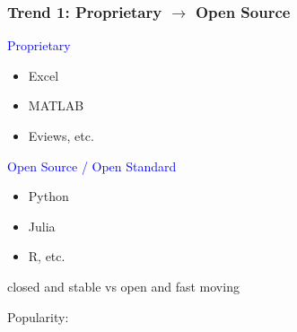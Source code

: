 \documentclass[
    xcolor={svgnames,dvipsnames},
    hyperref={colorlinks, citecolor=DeepPink4, linkcolor=DarkRed, urlcolor=DarkBlue}
    ]{beamer}  %
\newcommand{\blue}[1]{\textcolor{Blue}{\sf #1}}
\newcommand{\1}{\mathbbm 1}
\begin{document}
\begin{frame}
    \frametitle{Trend 1: Proprietary $\to$ Open Source}
    
    \blue{Proprietary} 
    \begin{itemize}
        \item Excel
        \item MATLAB
        \item Eviews, etc. 
    \end{itemize}
    

    \vspace{0.5em}
    \vspace{0.5em}
    \blue{Open Source / Open Standard} 
    
    \begin{itemize}
        \item Python
        \item Julia
        \item R, etc.
    \end{itemize}


    \begin{center}
        closed and stable vs open and fast moving
    \end{center}

\end{frame}

\begin{frame}

    Popularity:

    \begin{figure}
       \begin{center}
       \end{center}
    \end{figure}

\end{frame}
\end{document}
